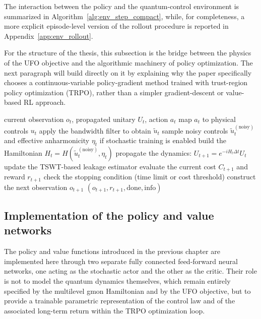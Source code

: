 The interaction between the policy and the quantum-control environment is summarized in Algorithm~\ref{alg:env_step_compact}, while, for completeness, a more explicit episode-level version of the rollout procedure is reported in Appendix~\ref{app:env_rollout}.

For the structure of the thesis, this subsection is the bridge between the physics of the UFO objective and the algorithmic machinery of policy optimization. The next paragraph will build directly on it by explaining why the paper specifically chooses a continuous-variable policy-gradient method trained with trust-region policy optimization (TRPO), rather than a simpler gradient-descent or value-based RL approach.

\begin{algorithm}[htbp]
\caption{Single environment step in the quantum-control RL setting}
\label{alg:env_step_compact}
\begin{algorithmic}[1]
\Require current observation $o_t$, propagated unitary $U_t$, action $a_t$
\State map $a_t$ to physical controls $u_t$
\State apply the bandwidth filter to obtain $\tilde u_t$
\State sample noisy controls $\tilde u_t^{(\mathrm{noisy})}$ and effective anharmonicity $\eta_t$ if stochastic training is enabled
\State build the Hamiltonian $H_t = H(\tilde u_t^{(\mathrm{noisy})}, \eta_t)$
\State propagate the dynamics: $U_{t+1} = e^{-i H_t \Delta t} U_t$
\State update the TSWT-based leakage estimator
\State evaluate the current cost $C_{t+1}$ and reward $r_{t+1}$
\State check the stopping condition (time limit or cost threshold)
\State construct the next observation $o_{t+1}$
\State \Return $(o_{t+1}, r_{t+1}, \mathrm{done}, \mathrm{info})$
\end{algorithmic}
\caption{Interaction between the policy and the quantum-control environment}
\end{algorithm}


\subsection{Implementation of the policy and value networks}
\label{subsec:implementation_policy_value_networks}

The policy and value functions introduced in the previous chapter are implemented here through two separate fully connected feed-forward neural networks, one acting as the stochastic actor and the other as the critic. Their role is not to model the quantum dynamics themselves, which remain entirely specified by the multilevel gmon Hamiltonian and by the UFO objective, but to provide a trainable parametric representation of the control law and of the associated long-term return within the TRPO optimization loop.

